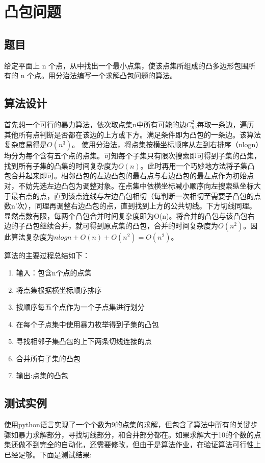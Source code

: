 \documentclass[UTF8]{ctexart}
\begin{document}
\newpage
\section{凸包问题}
\subsection{题目}
给定平面上 n 个点，从中找出一个最小点集，使该点集所组成的凸多边形包围所有的 n 个点。用分治法编写一个求解凸包问题的算法。

\subsection{算法设计}

首先想一个可行的暴力算法，依次取点集n中所有可能的边$C_n^2$,每取一条边，遍历其他所有点判断是否都在该边的上方或下方。满足条件即为凸包的一条边。该算法复杂度易得是$O(n^3)$。 使用分治法，将点集按横坐标顺序从左到右排序（nlogn）均分为每个含有五个点的点集。可知每个子集只有限次搜索即可得到子集的凸集，找到所有子集的凸集的时间复杂度为$O(n)$。此时再用一个巧妙地方法将子集凸包合并起来即可。相邻凸包的左边凸包的最右点与右边凸包的最左点作为初始点对，不妨先选左边凸包为调整对象。在点集中依横坐标减小顺序向左搜索纵坐标大于最右点的点，直到该点连线与左边凸包相切（每判断一次相切至需要子凸包的点数n'次），同理再调整右边凸包的点，直到找到上方的公共切线。下方切线同理。显然点数有限，每两个凸包合并时间复杂度即为O(n)。将合并的凸包与该凸包右边的子凸包继续合并，就可得到原点集的凸包，合并的时间复杂度为$O(n^2)$。因此算法复杂度为$nlogn+O(n)+O(n^2)=O(n^2)$。	\vspace{3mm}

算法的主要过程总结如下：
\begin{enumerate}
	\item 输入：包含n个点的点集
	\item 将点集根据横坐标顺序排序
	\item 按顺序每五个点作为一个子点集进行划分
	\item 在每个子点集中使用暴力枚举得到子集的凸包
	\item 寻找相邻子集凸包的上下两条切线连接的点
  \item 合并所有子集的凸包
	\item 输出:点集的凸包
\end{enumerate}


\subsection{测试实例}
使用python语言实现了一个个数为9的点集的求解，但包含了算法中所有的关键步骤如暴力求解部分，寻找切线部分，和合并部分都在。如果求解大于10的个数的点集还做不到完全的自动化，还需要修改，但由于是算法作业，在验证算法可行性上已经足够。下面是测试结果:
\end{document}

